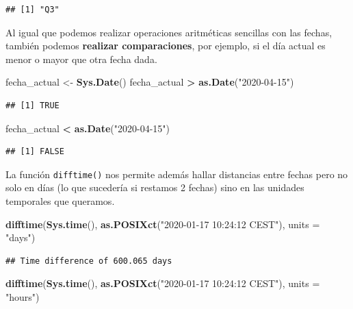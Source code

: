 \documentclass[11pt,]{book}
\newenvironment{Shaded}{\begin{snugshade}}{\end{snugshade}}
\newcommand{\DataTypeTok}[1]{\textcolor[rgb]{0.27,0.27,0.27}{#1}}
\newcommand{\KeywordTok}[1]{\textcolor[rgb]{0.27,0.27,0.27}{\textbf{#1}}}
\newcommand{\NormalTok}[1]{#1}
\newcommand{\OperatorTok}[1]{\textcolor[rgb]{0.43,0.43,0.43}{\textbf{#1}}}
\newcommand{\StringTok}[1]{\textcolor[rgb]{0.5,0.5,0.5}{#1}}
\begin{document}
\begin{verbatim}
## [1] "Q3"
\end{verbatim}

Al igual que podemos realizar operaciones aritméticas sencillas con las fechas, también podemos \textbf{realizar comparaciones}, por ejemplo, si el día actual es menor o mayor que otra fecha dada.

\begin{Shaded}
\begin{Highlighting}[]
\NormalTok{fecha_actual <-}\StringTok{ }\KeywordTok{Sys.Date}\NormalTok{()}
\NormalTok{fecha_actual }\OperatorTok{>}\StringTok{ }\KeywordTok{as.Date}\NormalTok{(}\StringTok{"2020-04-15"}\NormalTok{)}
\end{Highlighting}
\end{Shaded}

\begin{verbatim}
## [1] TRUE
\end{verbatim}

\begin{Shaded}
\begin{Highlighting}[]
\NormalTok{fecha_actual }\OperatorTok{<}\StringTok{ }\KeywordTok{as.Date}\NormalTok{(}\StringTok{"2020-04-15"}\NormalTok{)}
\end{Highlighting}
\end{Shaded}

\begin{verbatim}
## [1] FALSE
\end{verbatim}

La función \texttt{difftime()} nos permite además hallar distancias entre fechas pero no solo en días (lo que sucedería si restamos 2 fechas) sino en las unidades temporales que queramos.

\begin{Shaded}
\begin{Highlighting}[]
\KeywordTok{difftime}\NormalTok{(}\KeywordTok{Sys.time}\NormalTok{(), }\KeywordTok{as.POSIXct}\NormalTok{(}\StringTok{"2020-01-17 10:24:12 CEST"}\NormalTok{), }\DataTypeTok{units =} \StringTok{"days"}\NormalTok{)}
\end{Highlighting}
\end{Shaded}

\begin{verbatim}
## Time difference of 600.065 days
\end{verbatim}

\begin{Shaded}
\begin{Highlighting}[]
\KeywordTok{difftime}\NormalTok{(}\KeywordTok{Sys.time}\NormalTok{(), }\KeywordTok{as.POSIXct}\NormalTok{(}\StringTok{"2020-01-17 10:24:12 CEST"}\NormalTok{), }\DataTypeTok{units =} \StringTok{"hours"}\NormalTok{)}
\end{Highlighting}
\end{Shaded}
\end{document}
